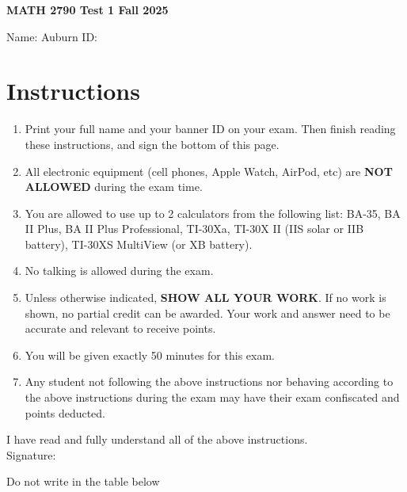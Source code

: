 \documentclass[12pt]{article}
\begin{document}
\begin{center}
    \Large \textbf{MATH 2790 Test 1 Fall 2025} \\[1em]
\end{center}

\vspace{.25cm}

\noindent Name: \underline{\hspace{8cm}} \hspace{.25cm} Auburn ID: \underline{\hspace{4cm}}



\section*{Instructions}
\begin{enumerate}[label=\arabic*.]
\item Print your full name and your banner ID on your exam. Then finish reading these instructions, and sign the bottom of this page.
\item All electronic equipment (cell phones, Apple Watch, AirPod, etc) are \textbf{NOT ALLOWED} during the exam time.
\item You are allowed to use up to 2 calculators from the following list: BA-35, BA II Plus, BA II Plus Professional, TI-30Xa, TI-30X II (IIS solar or IIB battery), TI-30XS MultiView (or XB battery).
\item No talking is allowed during the exam.
\item Unless otherwise indicated, \textbf{SHOW ALL YOUR WORK}. If no work is shown, no partial credit can be awarded. Your work and answer need to be accurate and relevant to receive points.
\item You will be given exactly 50 minutes for this exam.
\item Any student not following the above instructions nor behaving according to the above instructions during the exam may have their exam confiscated and points deducted.
\end{enumerate}

I have read and fully understand all of the above instructions. \\[2em]
Signature: \hrulefill


\vspace{.75cm}
Do not write in the table below
\end{document}

